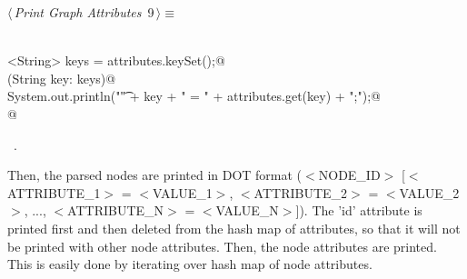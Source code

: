 \documentclass[a4paper]{report}
\begin{document}
\begin{flushleft} \small
\begin{minipage}{\linewidth}\label{scrap9}\raggedright\small
{} $\langle\,${\itshape Print Graph Attributes}\nobreak\ {\footnotesize {9}}$\,\rangle\equiv$
\vspace{-1ex}
\begin{list}{}{} \item
\mbox{}\verb@@\\
\mbox{}\verb@Set<String> keys = attributes.keySet();@\\
\mbox{}\verb@for(String key: keys){@\\
\mbox{}\verb@        System.out.println("\t" + key + " = " + attributes.get(key) + ";");@\\
\mbox{}\verb@}   @\\
\mbox{}\verb@@{\NWsep}
\end{list}
\vspace{-1.5ex}
\footnotesize
\begin{list}{}{\setlength{\itemsep}{-\parsep}\setlength{\itemindent}{-\leftmargin}}
\item \NWtxtMacroRefIn\ .

\item{}
\end{list}
\end{minipage}\vspace{4ex}
\end{flushleft}
Then, the parsed nodes are printed in DOT format ($<$NODE\_ID$>$ [$<$ATTRIBUTE\_1$>$ = $<$VALUE\_1$>$, $<$ATTRIBUTE\_2$>$ = $<$VALUE\_2$>$, ..., $<$ATTRIBUTE\_N$>$ = $<$VALUE\_N$>$]). The 'id' attribute is printed first and then deleted from the hash map of attributes, so that it will not be printed with other node attributes. Then, the node attributes are printed. This is easily done by iterating over hash map of node attributes.
\end{document}
